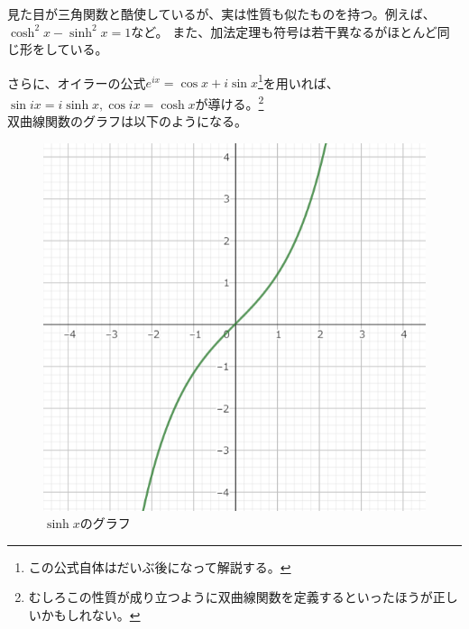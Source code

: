 \documentclass[a4j,dvipdfmx]{jsarticle}
\begin{document}
                見た目が三角関数と酷使しているが、実は性質も似たものを持つ。例えば、$\cosh^2 x - \sinh^2 x = 1$など。
                また、加法定理も符号は若干異なるがほとんど同じ形をしている。

                さらに、オイラーの公式$e^{ix}=\cos x + i\sin x$\footnote{この公式自体はだいぶ後になって解説する。}を用いれば、
                $\sin ix = i\sinh x,\cos ix=\cosh x$が導ける。\footnote{むしろこの性質が成り立つように双曲線関数を定義するといったほうが正しいかもしれない。}\\

                双曲線関数のグラフは以下のようになる。
                \begin{figure}[h]
                    \begin{minipage}{5cm}
                        \centering
                        \includegraphics[keepaspectratio,scale=0.3]{img/QuuNote/SinhFuncGraph.png}
                        \caption{$\sinh x$のグラフ}
                    \end{minipage}
                    \begin{minipage}{5cm}
                        \centering

\end{minipage}
\end{figure}
\end{document}
